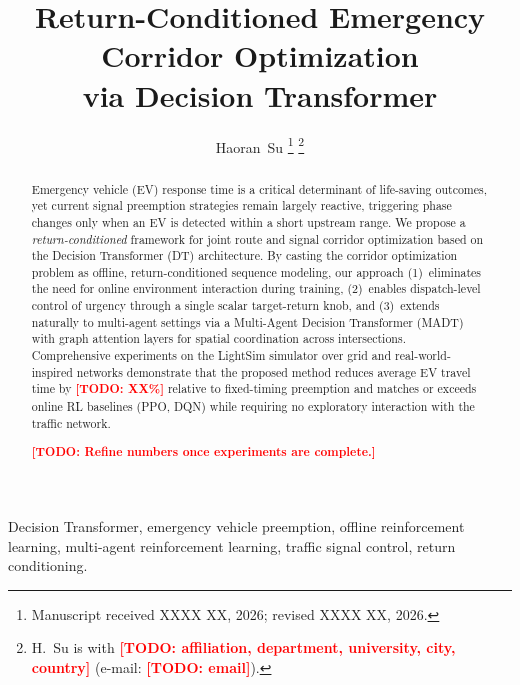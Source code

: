 \documentclass[journal]{IEEEtran}
\newcommand{\todo}[1]{\textcolor{red}{\textbf{[TODO: #1]}}}
\begin{document}
\title{Return-Conditioned Emergency Corridor Optimization\\
via Decision Transformer}

\author{Haoran~Su%
\thanks{Manuscript received XXXX XX, 2026; revised XXXX XX, 2026.}%
\thanks{H.~Su is with \todo{affiliation, department, university,
city, country} (e-mail: \todo{email}).}}


\maketitle

\begin{abstract}
Emergency vehicle (EV) response time is a critical determinant of
life-saving outcomes, yet current signal preemption strategies remain
largely reactive, triggering phase changes only when an EV is detected
within a short upstream range.  We propose a \emph{return-conditioned}
framework for joint route and signal corridor optimization based on the
Decision Transformer (DT) architecture.  By casting the corridor
optimization problem as offline, return-conditioned sequence modeling,
our approach (1)~eliminates the need for online environment interaction
during training, (2)~enables dispatch-level control of urgency through
a single scalar target-return knob, and (3)~extends naturally to
multi-agent settings via a Multi-Agent Decision Transformer (MADT) with
graph attention layers for spatial coordination across intersections.
Comprehensive experiments on the LightSim simulator over grid and
real-world-inspired networks demonstrate that the proposed method
reduces average EV travel time by \todo{XX\%} relative to fixed-timing
preemption and matches or exceeds online RL baselines (PPO, DQN) while
requiring no exploratory interaction with the traffic network.

\todo{Refine numbers once experiments are complete.}
\end{abstract}

\begin{IEEEkeywords}
Decision Transformer, emergency vehicle preemption, offline
reinforcement learning, multi-agent reinforcement learning, traffic
signal control, return conditioning.
\end{IEEEkeywords}
\end{document}

